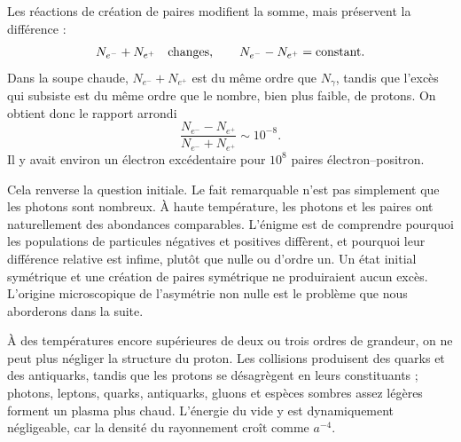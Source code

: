 \begin{classroomqa}
\end{classroomqa}

Les réactions de création de paires modifient la somme, mais préservent la différence :
\begin{equation}
N_{e^-}+N_{e^+}\quad\hbox{changes},
\qquad
N_{e^-}-N_{e^+}=\hbox{constant}.
\label{eq:c07-pair-invariants}
\end{equation}
Dans la soupe chaude, \(N_{e^-}+N_{e^+}\) est du même ordre que \(N_\gamma\), tandis que l’excès qui subsiste est du même ordre que le nombre, bien plus faible, de protons. On obtient donc le rapport arrondi
\begin{equation}
\boxed{
\frac{N_{e^-}-N_{e^+}}
{N_{e^-}+N_{e^+}}
\sim10^{-8}
}.
\label{eq:c07-asymmetry}
\end{equation}
Il y avait environ un électron excédentaire pour \(10^8\) paires électron--positron.

Cela renverse la question initiale. Le fait remarquable n’est pas simplement que les photons sont nombreux. À haute température, les photons et les paires ont naturellement des abondances comparables. L’énigme est de comprendre pourquoi les populations de particules négatives et positives diffèrent, et pourquoi leur différence relative est infime, plutôt que nulle ou d’ordre un. Un état initial symétrique et une création de paires symétrique ne produiraient aucun excès. L’origine microscopique de l’asymétrie non nulle est le problème que nous aborderons dans la suite.

À des températures encore supérieures de deux ou trois ordres de grandeur, on ne peut plus négliger la structure du proton. Les collisions produisent des quarks et des antiquarks, tandis que les protons se désagrègent en leurs constituants ; photons, leptons, quarks, antiquarks, gluons et espèces sombres assez légères forment un plasma plus chaud. L’énergie du vide y est dynamiquement négligeable, car la densité du rayonnement croît comme \(a^{-4}\).

